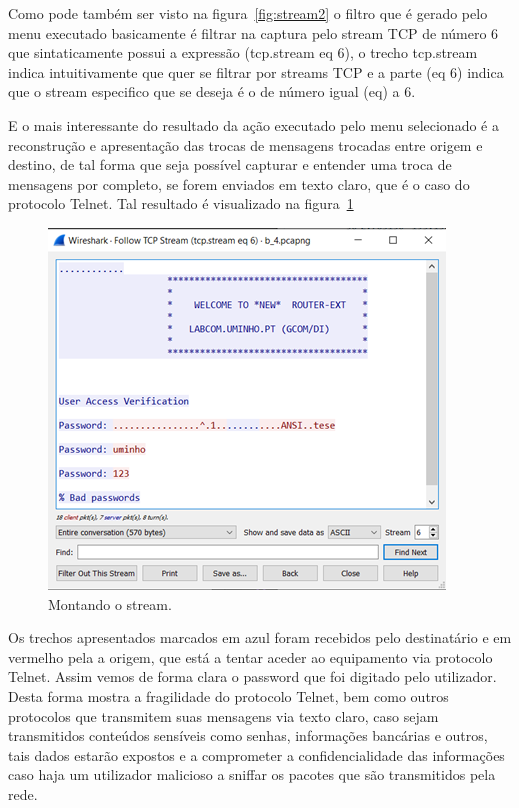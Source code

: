 \documentclass{llncs}
\begin{document}
\begin{enumerate}[\textbf{c)}]
  \begin{flushleft}
    \par Como pode também ser visto na figura~\ref{fig:stream2} o filtro que é gerado pelo menu executado basicamente é filtrar na captura pelo stream TCP de número 6 que sintaticamente possui a expressão (tcp.stream eq 6), o trecho tcp.stream indica intuitivamente que quer se filtrar por streams TCP e a parte (eq 6) indica que o stream especifico que se deseja é o de número igual (eq) a 6.
    \par E o mais interessante do resultado da ação executado pelo menu selecionado é a reconstrução e apresentação das trocas de mensagens trocadas entre origem e destino, de tal forma que seja possível capturar e entender uma troca de mensagens por completo, se forem enviados em texto claro, que é o caso do protocolo Telnet. Tal resultado é visualizado na figura~\ref{fig:followstream}
    \begin{figure}[h]
      \includegraphics[scale=0.65]{followstream.png}
      \centering
      \caption{Montando o stream.}
      \label{fig:followstream}
    \end{figure}
  \end{flushleft}

  \begin{flushleft}
    \par Os trechos apresentados marcados em azul foram recebidos pelo destinatário e em vermelho pela a origem, que está a tentar aceder ao equipamento via protocolo Telnet. Assim vemos de forma clara o password que foi digitado pelo utilizador. Desta forma mostra a fragilidade do protocolo Telnet, bem como outros protocolos que transmitem suas mensagens via texto claro, caso sejam transmitidos conteúdos sensíveis como senhas, informações bancárias e outros, tais dados estarão expostos e a comprometer a confidencialidade das informações caso haja um utilizador malicioso a sniffar os pacotes que são transmitidos pela rede.
  \end{flushleft}
\end{enumerate}
\end{document}
